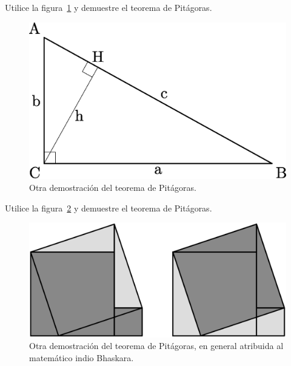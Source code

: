 \begin{exercise}
	Utilice la figura~\ref{fig:semejanza} y 
	demuestre el teorema de Pitágoras.
	\begin{figure}[h]
		\centering
		\includegraphics[scale=.2]{images/pitagoras_semejanza}
		\caption{Otra demostración del teorema de Pitágoras.}
		\label{fig:semejanza}
	\end{figure}
\end{exercise}

\begin{exercise}
	Utilice la figura~\ref{fig:Bhaskara} y 
	demuestre el teorema de Pitágoras.
	\begin{figure}[h]
		\centering
		\includegraphics[scale=.2]{images/pitagoras_bhaskara}
		\caption{Otra demostración del teorema de Pitágoras, en general
		atribuida al matemático indio Bhaskara.}
		\label{fig:Bhaskara}
	\end{figure}
\end{exercise}


